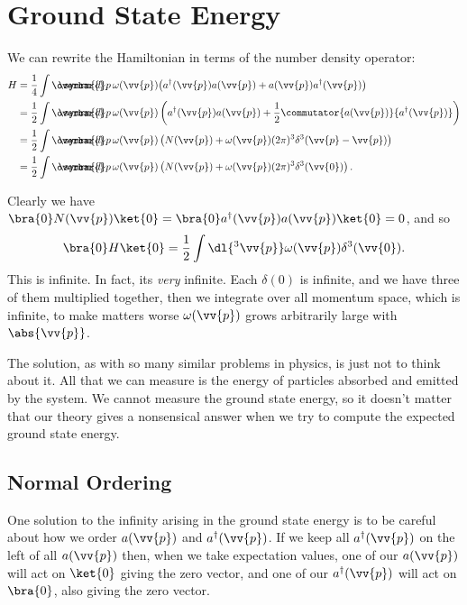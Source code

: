 \documentclass[fleqn]{NotesClass}
\newcommand{\hermit}{{\dagger}}
\newcommand\dbar{\ThisStyle{\ensurestackMath{%
            \stackengine{-.3\LMpt}{\SavedStyle \symrm{d}}{\SavedStyle\overbar{}%
                \mkern2.25mu}{O}{r}{F}{F}{L}}}}
\newcommand{\invariantmeasure}[1]{\dbar #1}
\begin{document}
    \section{Ground State Energy}
    We can rewrite the Hamiltonian in terms of the number density operator:
    \begin{align}
        H &= \frac{1}{4} \int \invariantmeasure{p} \, \omega(\vv{p}) \big( a^\hermit(\vv{p}) a(\vv{p}) + a(\vv{p})a^\hermit(\vv{p}) \big)\\
        &= \frac{1}{2} \int \invariantmeasure{p} \, \omega(\vv{p}) \left( a^\hermit(\vv{p})a(\vv{p}) + \frac{1}{2} \commutator{a(\vv{p})}{a^\hermit(\vv{p})} \right)\\
        &= \frac{1}{2} \int \invariantmeasure{p} \, \omega(\vv{p}) \left( N(\vv{p}) + \omega(\vv{p})(2\pi)^3 \delta^3(\vv{p} - \vv{p}) \right)\\
        &= \frac{1}{2} \int \invariantmeasure{p} \, \omega(\vv{p}) \left( N(\vv{p}) + \omega(\vv{p})(2\pi)^3 \delta^3(\vv{0}) \right).
    \end{align}
    
    Clearly we have \(\bra{0}N(\vv{p})\ket{0} = \bra{0} a^\hermit(\vv{p})a(\vv{p})\ket{0} = 0\), and so
    \begin{equation}
        \bra{0}H\ket{0} = \frac{1}{2} \int \dl{^3\vv{p}} \omega(\vv{p}) \delta^3(\vv{0}).
    \end{equation}
    This is infinite.
    In fact, its \emph{very} infinite.
    Each \(\delta(0)\) is infinite, and we have three of them multiplied together, then we integrate over all momentum space, which is infinite, to make matters worse \(\omega(\vv{p})\) grows arbitrarily large with \(\abs{\vv{p}}\).
    
    The solution, as with so many similar problems in physics, is just not to think about it.
    All that we can measure is the energy of particles absorbed and emitted by the system.
    We cannot measure the ground state energy, so it doesn't matter that our theory gives a nonsensical answer when we try to compute the expected ground state energy.
    
    \subsection{Normal Ordering}
    One solution to the infinity arising in the ground state energy is to be careful about how we order \(a(\vv{p})\) and \(a^\hermit(\vv{p})\).
    If we keep all \(a^\hermit(\vv{p})\) on the left of all \(a(\vv{p})\) then, when we take expectation values, one of our \(a(\vv{p})\) will act on \(\ket{0}\) giving the zero vector, and one of our \(a^\hermit(\vv{p})\) will act on \(\bra{0}\), also giving the zero vector.
    
\end{document}
